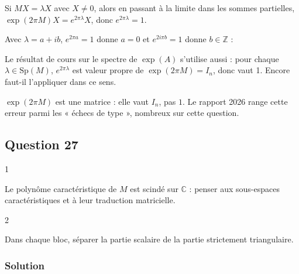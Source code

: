 \documentclass[11pt,a4paper]{article}
\newcommand{\equationajustee}[1]{%
  \sbox{\boiteequation}{$\displaystyle #1$}%
  \ifdim\wd\boiteequation>\linewidth
    \[\resizebox{\linewidth}{!}{\usebox{\boiteequation}}\]%
  \else
    \[#1\]%
  \fi}
\begin{document}
\equationajustee{\boxed{\exp(2\pi M)=I_n}}

Si \(MX=\lambda X\) avec \(X\neq0\), alors en passant à la limite dans les sommes partielles, \(\exp(2\pi M)X=e^{2\pi\lambda}X\), donc \(e^{2\pi\lambda}=1\).

Avec \(\lambda=a+ib\), \(e^{2\pi a}=1\) donne \(a=0\) et \(e^{2i\pi b}=1\) donne \(b\in\mathbb{Z}\) :

\equationajustee{\boxed{{\mathrm{Sp}}_{\mathbb{C}}(M)\subset\{ik,\ k\in\mathbb{Z}\}.}}

\begin{methode}

Le résultat de cours sur le spectre de \(\exp(A)\) s'utilise aussi : pour chaque \(\lambda\in\mathrm{Sp}(M)\), \(e^{2\pi\lambda}\) est valeur propre de \(\exp(2\pi M)=I_n\), donc vaut 1. Encore faut-il l'appliquer dans ce sens.

\end{methode}

\begin{piege}

\(\exp(2\pi M)\) est une matrice : elle vaut \(I_n\), pas \(1\). Le rapport 2026 range cette erreur parmi les « échecs de type », nombreux sur cette question.

\end{piege}

\hypertarget{question-27}{%
\subsection{Question 27}\label{question-27}}

\begin{indication}{1}

Le polynôme caractéristique de \(M\) est scindé sur \(\mathbb{C}\) : penser aux sous-espaces caractéristiques et à leur traduction matricielle.

\end{indication}

\begin{indication}{2}

Dans chaque bloc, séparer la partie scalaire de la partie strictement triangulaire.

\end{indication}

\hypertarget{solution-26}{%
\subsubsection{Solution}\label{solution-26}}
\end{document}
